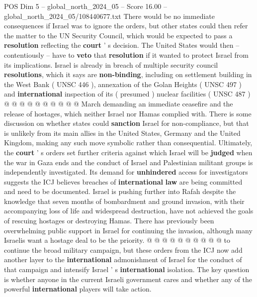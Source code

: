 \begin{textsample}{POS Dim 5 – global\_north\_2024\_05 – Score 16.00 – global\_north\_2024\_05/108440677.txt}
There would be no immediate consequences if Israel was to ignore the orders, but other states could then refer the matter to the UN Security Council, which would be expected to pass a \textbf{resolution} reflecting the \textbf{court} ' s decision.
The United States would then -- contentiously -- have to \textbf{veto} that \textbf{resolution} if it wanted to protect Israel from its implications.
Israel is already in breach of multiple security council \textbf{resolutions}, which it says are \textbf{non-binding}, including on settlement building in the West Bank ( UNSC 446 ), annexation of the Golan Heights ( UNSC 497 ) and \textbf{international} inspection of its ( presumed ) nuclear facilities ( UNSC 487 ) @ @ @ @ @ @ @ @ @ @ March demanding an immediate ceasefire and the release of hostages, which neither Israel nor Hamas complied with.
There is some discussion on whether states could \textbf{sanction} Israel for non-compliance, but that is unlikely from its main allies in the United States, Germany and the United Kingdom, making any such move symbolic rather than consequential.
Ultimately, the \textbf{court} ' s orders set further criteria against which Israel will be \textbf{judged} when the war in Gaza ends and the conduct of Israel and Palestinian militant groups is independently investigated.
Its demand for \textbf{unhindered} access for investigators suggests the ICJ believes breaches of \textbf{international} \textbf{law} are being committed and need to be documented.
Israel is pushing further into Rafah despite the knowledge that seven months of bombardment and ground invasion, with their accompanying loss of life and widespread destruction, have not achieved the goals of rescuing hostages or destroying Hamas.
There has previously been overwhelming public support in Israel for continuing the invasion, although many Israelis want a hostage deal to be the priority. @ @ @ @ @ @ @ @ @ @ to continue the broad military campaign, but these orders from the ICJ now add another layer to the \textbf{international} admonishment of Israel for the conduct of that campaign and intensify Israel ' s \textbf{international} isolation.
The key question is whether anyone in the current Israeli government cares and whether any of the powerful \textbf{international} players will take action.

\end{textsample}
